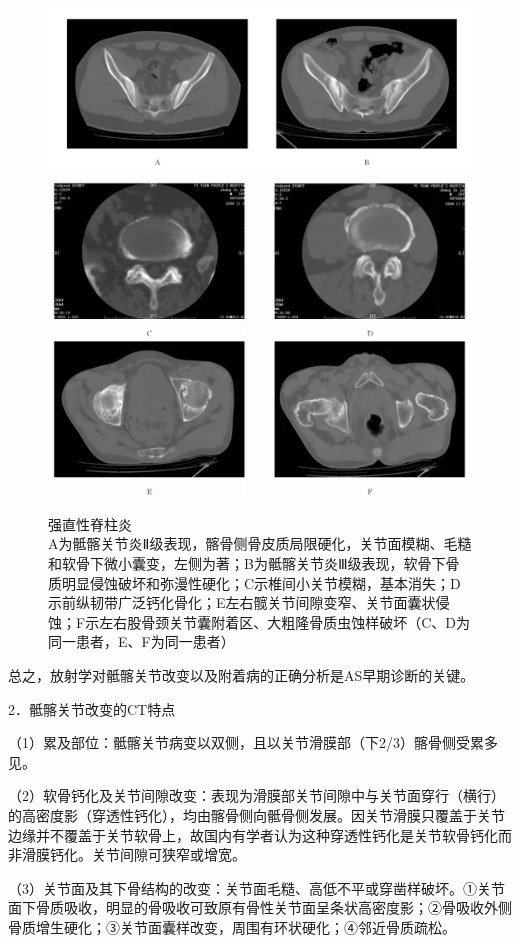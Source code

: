 \begin{figure}[!htbp]
 \centering
 \includegraphics[width=.7\textwidth,height=\textheight,keepaspectratio]{./images/Image00455.jpg}
 \includegraphics[width=.7\textwidth,height=\textheight,keepaspectratio]{./images/Image00456.jpg}
 \captionsetup{justification=centering}
 \caption{强直性脊柱炎\\{\small A为骶髂关节炎Ⅱ级表现，髂骨侧骨皮质局限硬化，关节面模糊、毛糙和软骨下微小囊变，左侧为著；B为骶髂关节炎Ⅲ级表现，软骨下骨质明显侵蚀破坏和弥漫性硬化；C示椎间小关节模糊，基本消失；D示前纵韧带广泛钙化骨化；E左右髋关节间隙变窄、关节面囊状侵蚀；F示左右股骨颈关节囊附着区、大粗隆骨质虫蚀样破坏（C、D为同一患者，E、F为同一患者）}}
 \label{fig22-30}
  \end{figure} 

总之，放射学对骶髂关节改变以及附着病的正确分析是AS早期诊断的关键。

2．骶髂关节改变的CT特点

（1）累及部位：骶髂关节病变以双侧，且以关节滑膜部（下2/3）髂骨侧受累多见。

（2）软骨钙化及关节间隙改变：表现为滑膜部关节间隙中与关节面穿行（横行）的高密度影（穿透性钙化），均由髂骨侧向骶骨侧发展。因关节滑膜只覆盖于关节边缘并不覆盖于关节软骨上，故国内有学者认为这种穿透性钙化是关节软骨钙化而非滑膜钙化。关节间隙可狭窄或增宽。

（3）关节面及其下骨结构的改变：关节面毛糙、高低不平或穿凿样破坏。①关节面下骨质吸收，明显的骨吸收可致原有骨性关节面呈条状高密度影；②骨吸收外侧骨质增生硬化；③关节面囊样改变，周围有环状硬化；④邻近骨质疏松。

